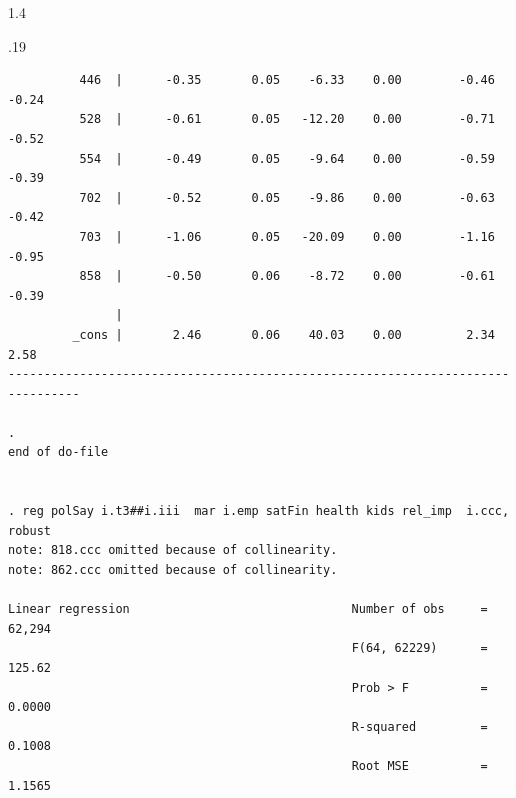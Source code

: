 \documentclass[10pt, letterpaper]{article}
\begin{document}
\begin{spacing}{1.4}
\begin{scriptsize}
\begin{spacing}{.19}
\begin{verbatim}
          446  |      -0.35       0.05    -6.33    0.00        -0.46       -0.24
          528  |      -0.61       0.05   -12.20    0.00        -0.71       -0.52
          554  |      -0.49       0.05    -9.64    0.00        -0.59       -0.39
          702  |      -0.52       0.05    -9.86    0.00        -0.63       -0.42
          703  |      -1.06       0.05   -20.09    0.00        -1.16       -0.95
          858  |      -0.50       0.06    -8.72    0.00        -0.61       -0.39
               |
         _cons |       2.46       0.06    40.03    0.00         2.34        2.58
--------------------------------------------------------------------------------

. 
end of do-file


. reg polSay i.t3##i.iii  mar i.emp satFin health kids rel_imp  i.ccc, robust
note: 818.ccc omitted because of collinearity.
note: 862.ccc omitted because of collinearity.

Linear regression                               Number of obs     =     62,294
                                                F(64, 62229)      =     125.62
                                                Prob > F          =     0.0000
                                                R-squared         =     0.1008
                                                Root MSE          =     1.1565


\end{verbatim}
\end{spacing}
\end{scriptsize}
\end{spacing}
\end{document}
